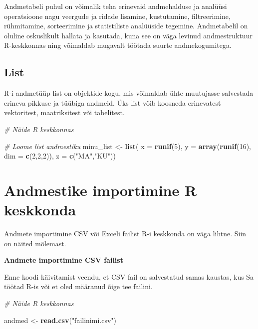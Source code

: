 \documentclass[
]{book}
\newenvironment{Shaded}{\begin{snugshade}}{\end{snugshade}}
\newcommand{\AttributeTok}[1]{\textcolor[rgb]{0.13,0.29,0.53}{#1}}
\newcommand{\CommentTok}[1]{\textcolor[rgb]{0.56,0.35,0.01}{\textit{#1}}}
\newcommand{\DecValTok}[1]{\textcolor[rgb]{0.00,0.00,0.81}{#1}}
\newcommand{\FunctionTok}[1]{\textcolor[rgb]{0.13,0.29,0.53}{\textbf{#1}}}
\newcommand{\NormalTok}[1]{#1}
\newcommand{\OtherTok}[1]{\textcolor[rgb]{0.56,0.35,0.01}{#1}}
\newcommand{\StringTok}[1]{\textcolor[rgb]{0.31,0.60,0.02}{#1}}
\renewenvironment{Shaded} {\begin{snugshade}\footnotesize} {\end{snugshade}}
\theoremstyle{definition}
\theoremstyle{definition}
\theoremstyle{definition}
\theoremstyle{definition}
\theoremstyle{remark}
\begin{document}
Andmetabeli puhul on võimalik teha erinevaid andmehalduse ja analüüsi operatsioone nagu veergude ja ridade lisamine, kustutamine, filtreerimine, rühmitamine, sorteerimine ja statistiliste analüüside tegemine. Andmetabelil on oluline oskuslikult hallata ja kasutada, kuna see on väga levinud andmestruktuur R-keskkonnas ning võimaldab mugavalt töötada suurte andmekogumitega.

\subsection{List}\label{list}

R-i andmetüüp list on objektide kogu, mis võimaldab ühte muutujasse salvestada erineva pikkuse ja tüübiga andmeid. Üks list võib koosneda erinevatest vektoritest, maatriksitest või tabelitest.

\begin{Shaded}
\begin{Highlighting}[]
\CommentTok{\# Näide R keskkonnas}

\CommentTok{\# Loome list andmestiku}
\NormalTok{minu\_list }\OtherTok{\textless{}{-}} \FunctionTok{list}\NormalTok{(}
  \AttributeTok{x =} \FunctionTok{runif}\NormalTok{(}\DecValTok{5}\NormalTok{), }
  \AttributeTok{y =} \FunctionTok{array}\NormalTok{(}\FunctionTok{runif}\NormalTok{(}\DecValTok{16}\NormalTok{), }\AttributeTok{dim =} \FunctionTok{c}\NormalTok{(}\DecValTok{2}\NormalTok{,}\DecValTok{2}\NormalTok{,}\DecValTok{2}\NormalTok{)), }
  \AttributeTok{z =} \FunctionTok{c}\NormalTok{(}\StringTok{"MA"}\NormalTok{,}\StringTok{"KU"}\NormalTok{))}
\end{Highlighting}
\end{Shaded}

\section{Andmestike importimine R keskkonda}\label{andmestike-importimine-r-keskkonda}

Andmete importimine CSV või Exceli failist R-i keskkonda on väga lihtne. Siin on näited mõlemast.

\textbf{Andmete importimine CSV failist}

Enne koodi käivitamist veendu, et CSV fail on salvestatud samas kaustas, kus Sa töötad R-is või et oled määranud õige tee failini.

\begin{Shaded}
\begin{Highlighting}[]
\CommentTok{\# Näide R keskkonnas}

\NormalTok{andmed }\OtherTok{\textless{}{-}} \FunctionTok{read.csv}\NormalTok{(}\StringTok{"failinimi.csv"}\NormalTok{)}
\end{Highlighting}
\end{Shaded}
\end{document}
